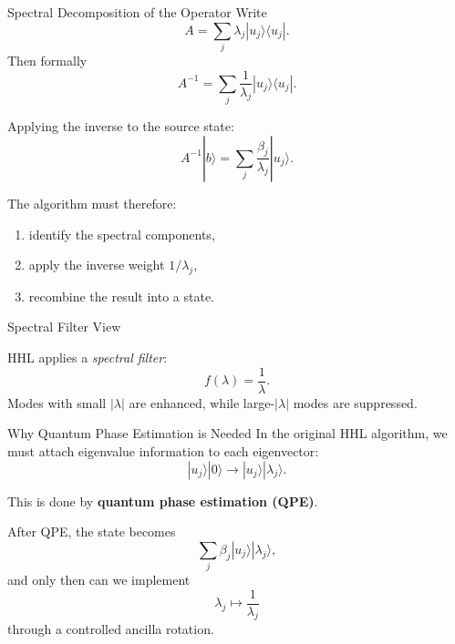 \documentclass{beamer}
\begin{document}
\begin{frame}{Spectral Decomposition of the Operator}
Write
\[
A = \sum_j \lambda_j |u_j\rangle\langle u_j|.
\]
Then formally
\[
A^{-1} = \sum_j \frac{1}{\lambda_j}|u_j\rangle\langle u_j|.
\]

Applying the inverse to the source state:
\[
A^{-1}|b\rangle
=
\sum_j \frac{\beta_j}{\lambda_j}|u_j\rangle.
\]

The algorithm must therefore:
\begin{enumerate}
\item identify the spectral components,
\item apply the inverse weight \(1/\lambda_j\),
\item recombine the result into a state.
\end{enumerate}
\end{frame}


\begin{frame}{Spectral Filter View}
\centering
{}

\vspace{0.3cm}
HHL applies a \emph{spectral filter}:
\[
f(\lambda)=\frac{1}{\lambda}.
\]
Modes with small \(|\lambda|\) are enhanced, while large-\(|\lambda|\) modes are suppressed.
\end{frame}



\begin{frame}{Why Quantum Phase Estimation is Needed}
In the original HHL algorithm, we must attach eigenvalue information to each eigenvector:
\[
|u_j\rangle |0\rangle
\longrightarrow
|u_j\rangle |\lambda_j\rangle.
\]

This is done by \textbf{quantum phase estimation (QPE)}.

After QPE, the state becomes
\[
\sum_j \beta_j |u_j\rangle |\lambda_j\rangle,
\]
and only then can we implement
\[
\lambda_j \mapsto \frac{1}{\lambda_j}
\]
through a controlled ancilla rotation.
\end{frame}
\end{document}

